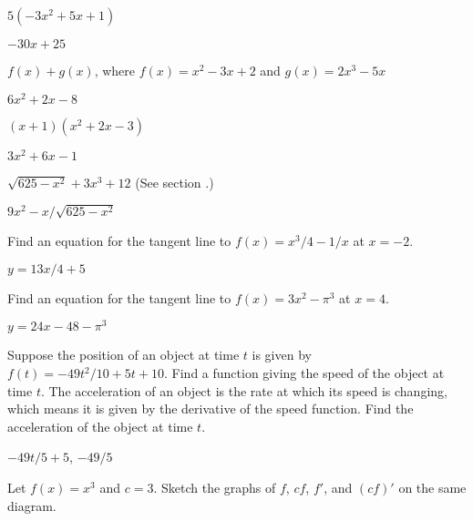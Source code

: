 \begin{exercises}
\begin{exercise} $5(-3x^2 + 5x + 1)$
\begin{answer} $-30x+25$
\end{answer}\end{exercise}

\begin{exercise} $f(x)+g(x)$, where $f(x)=x^2-3x+2$ and $g(x)=2x^3-5x$
\begin{answer} $6x^2+2x-8$
\end{answer}\end{exercise}

\begin{exercise} $(x+1)(x^2+2x-3)$
\begin{answer} $3x^2+6x-1$
\end{answer}\end{exercise}

\begin{exercise} $\sqrt{625-x^2}+3x^3+12$ (See section .)
\begin{answer} $9x^2-x/\sqrt{625-x^2}$
\end{answer}\end{exercise}

\begin{exercise}
 Find an equation for the tangent line to $f(x) = x^3/4 - 1/x$ at $x=-2$.
\begin{answer} $y=13x/4+5$
\end{answer}\end{exercise}

\begin{exercise} Find an equation for 
the tangent line to $f(x)= 3x^2 - \pi ^3$ at $x= 4$.
\begin{answer} $y=24x-48-\pi^3$
\end{answer}\end{exercise}

\begin{exercise} Suppose the position of an object at time $t$ is  given by
$f(t)=-49 t^2/10+5t+10$. Find a function giving the speed of the object
at time $t$. The acceleration of an object is the rate at which its
speed is changing, which means it is given by the derivative of the
speed function. Find the acceleration of the object at time $t$.
\begin{answer} $-49t/5+5$, $-49/5$
\end{answer}\end{exercise}

\begin{exercise} Let $f(x) =x^3$ and $c= 3$. Sketch the graphs of $f$,
$cf$, $f'$, and $(cf)'$ on the same diagram.
\end{exercise}


\end{exercises}
